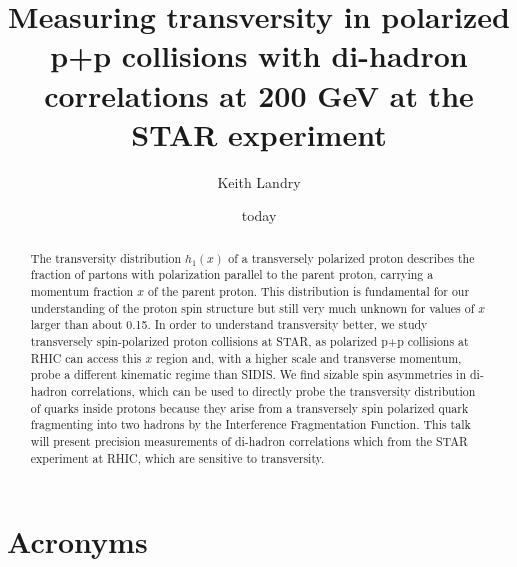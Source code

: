 \documentclass[abstract = on,listof=totoc, bibliography=totoc]{scrreprt}
\begin{document}
\title{Measuring transversity in polarized p+p collisions with di-hadron correlations at  200 GeV at the STAR experiment}
\author{Keith Landry}
\date{today}
\maketitle

\begin{abstract}
The transversity distribution $h_1(x)$ of a transversely polarized proton describes the fraction of partons with polarization parallel to the parent proton, carrying a momentum fraction $x$ of the parent proton. This distribution is fundamental for our understanding of the proton spin structure but still very much unknown for values of $x$ larger than about 0.15. In order to understand transversity better, we study transversely spin-polarized proton collisions at STAR, as polarized p+p collisions at RHIC can access this $x$ region and, with a higher scale and transverse momentum,  probe a different kinematic regime than SIDIS. We find sizable spin asymmetries in di-hadron correlations, which can be used to directly probe the transversity distribution of quarks inside protons because they arise from a transversely spin polarized quark fragmenting into two hadrons by the Interference Fragmentation Function. This talk will present precision measurements of di-hadron correlations which from the STAR experiment at RHIC, which are sensitive to transversity.
\end{abstract}

\tableofcontents
\listoffigures
\listoftables


\chapter*{Acronyms}
 
\end{document}
